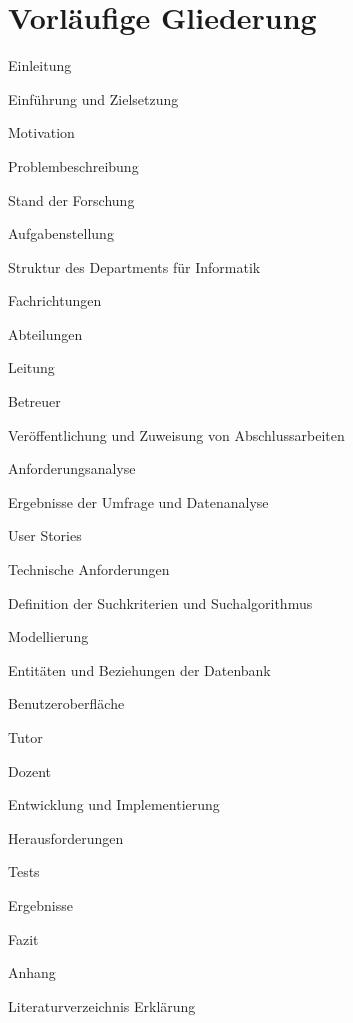 \section{Vorläufige Gliederung}

\begin{legal}[noitemsep]
\item Einleitung
	\begin{legal}
	\item Einführung und Zielsetzung
	\item Motivation
	\item Problembeschreibung
	\item Stand der Forschung
	\item Aufgabenstellung
	\end{legal}
\item Struktur des Departments für Informatik
	\begin{legal}
	\item Fachrichtungen
		\begin{legal}
		\item  Abteilungen
			\begin{legal}
			\item  Leitung
			\item  Betreuer
			\item  Veröffentlichung und Zuweisung von Abschlussarbeiten
			\end{legal}
		\end{legal}
	\end{legal}
\item Anforderungsanalyse
	\begin{legal}
	\item Ergebnisse der Umfrage und Datenanalyse
	\item User Stories
	\item Technische Anforderungen
	\item Definition der Suchkriterien und Suchalgorithmus
	\item Modellierung
		\begin{legal}
		\item  Entitäten und Beziehungen der Datenbank
		\item  Benutzeroberfläche
			\begin{legal}
			\item  Tutor
			\item  Dozent
			\end{legal}
		\end{legal}
	\end{legal}
\item Entwicklung und Implementierung
	\begin{legal}
	\item Herausforderungen
	\item Tests
	\item Ergebnisse
	\end{legal}
\item Fazit
\item Anhang
\item Literaturverzeichnis
Erklärung
\end{legal}